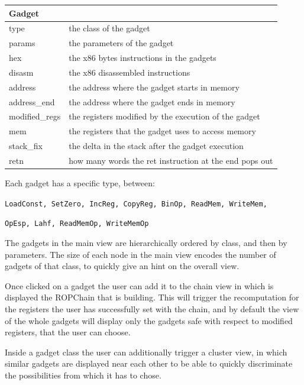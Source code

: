 \documentclass[11pt]{article}
\begin{document}
\bigskip

\begin{center}
  \begin{tabular}{|l|l|}
    \hline
    \textbf{Gadget} & \\ \hline
    type & the class of the gadget \\ \hline
    params & the parameters of the gadget \\ \hline
    hex & the x86 bytes instructions in the gadgets \\ \hline
    disasm & the x86 disassembled instructions \\ \hline
    address & the address where the gadget starts in memory \\ \hline
    address\_end & the address where the gadget ends in memory \\ \hline
    modified\_regs & the registers modified by the execution of the gadget \\ \hline
    mem & the registers that the gadget uses to access memory \\ \hline
    stack\_fix & the delta in the stack after the gadget execution \\ \hline
    retn & how many words the ret instruction at the end pops out \\ \hline
  \end{tabular}
\end{center}

\bigskip
Each gadget has a specific type, between:

\bigskip\noindent
\texttt{LoadConst, SetZero, IncReg, CopyReg,  BinOp, ReadMem, WriteMem,}

\noindent\texttt{OpEsp, Lahf, ReadMemOp, WriteMemOp}

\bigskip
The gadgets in the main view are hierarchically ordered by class, and then by parameters. The size of each node in the main view encodes the number of gadgets of that class, to quickly give an hint on the overall view.

\bigskip
Once clicked on a gadget the user can add it to the chain view in which is displayed the ROPChain that is building. This will trigger the recomputation for the registers the user has successfully set with the chain, and by default the view of the whole gadgets will display only the gadgets safe with respect to modified registers, that the user can choose.

Inside a gadget class the user can additionally trigger a cluster view, in which similar gadgets are displayed near each other to be able to quickly discriminate the possibilities from which it has to chose.
\end{document}
